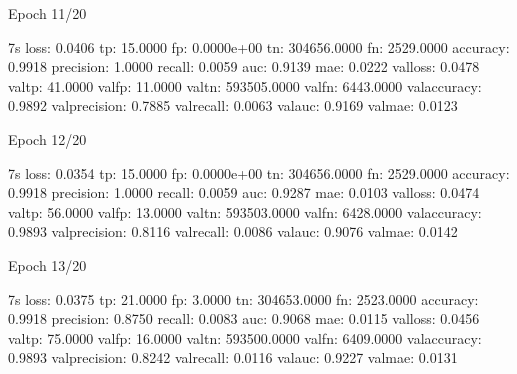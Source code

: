 \documentclass[letterpaper,10pt,english]{sphinxmanual}
\begin{document}
\begin{sphinxVerbatim}[commandchars=\\\{\}]
Epoch 11/20
\end{sphinxVerbatim}

\begin{sphinxVerbatim}[commandchars=\\\{\}]
 \PYGZhy{} 7s \PYGZhy{} loss: 0.0406 \PYGZhy{} tp: 15.0000 \PYGZhy{} fp: 0.0000e+00 \PYGZhy{} tn: 304656.0000 \PYGZhy{} fn: 2529.0000 \PYGZhy{} accuracy: 0.9918 \PYGZhy{} precision: 1.0000 \PYGZhy{} recall: 0.0059 \PYGZhy{} auc: 0.9139 \PYGZhy{} mae: 0.0222 \PYGZhy{} val\PYGZus{}loss: 0.0478 \PYGZhy{} val\PYGZus{}tp: 41.0000 \PYGZhy{} val\PYGZus{}fp: 11.0000 \PYGZhy{} val\PYGZus{}tn: 593505.0000 \PYGZhy{} val\PYGZus{}fn: 6443.0000 \PYGZhy{} val\PYGZus{}accuracy: 0.9892 \PYGZhy{} val\PYGZus{}precision: 0.7885 \PYGZhy{} val\PYGZus{}recall: 0.0063 \PYGZhy{} val\PYGZus{}auc: 0.9169 \PYGZhy{} val\PYGZus{}mae: 0.0123
\end{sphinxVerbatim}

\begin{sphinxVerbatim}[commandchars=\\\{\}]
Epoch 12/20
\end{sphinxVerbatim}

\begin{sphinxVerbatim}[commandchars=\\\{\}]
 \PYGZhy{} 7s \PYGZhy{} loss: 0.0354 \PYGZhy{} tp: 15.0000 \PYGZhy{} fp: 0.0000e+00 \PYGZhy{} tn: 304656.0000 \PYGZhy{} fn: 2529.0000 \PYGZhy{} accuracy: 0.9918 \PYGZhy{} precision: 1.0000 \PYGZhy{} recall: 0.0059 \PYGZhy{} auc: 0.9287 \PYGZhy{} mae: 0.0103 \PYGZhy{} val\PYGZus{}loss: 0.0474 \PYGZhy{} val\PYGZus{}tp: 56.0000 \PYGZhy{} val\PYGZus{}fp: 13.0000 \PYGZhy{} val\PYGZus{}tn: 593503.0000 \PYGZhy{} val\PYGZus{}fn: 6428.0000 \PYGZhy{} val\PYGZus{}accuracy: 0.9893 \PYGZhy{} val\PYGZus{}precision: 0.8116 \PYGZhy{} val\PYGZus{}recall: 0.0086 \PYGZhy{} val\PYGZus{}auc: 0.9076 \PYGZhy{} val\PYGZus{}mae: 0.0142
\end{sphinxVerbatim}

\begin{sphinxVerbatim}[commandchars=\\\{\}]
Epoch 13/20
\end{sphinxVerbatim}

\begin{sphinxVerbatim}[commandchars=\\\{\}]
 \PYGZhy{} 7s \PYGZhy{} loss: 0.0375 \PYGZhy{} tp: 21.0000 \PYGZhy{} fp: 3.0000 \PYGZhy{} tn: 304653.0000 \PYGZhy{} fn: 2523.0000 \PYGZhy{} accuracy: 0.9918 \PYGZhy{} precision: 0.8750 \PYGZhy{} recall: 0.0083 \PYGZhy{} auc: 0.9068 \PYGZhy{} mae: 0.0115 \PYGZhy{} val\PYGZus{}loss: 0.0456 \PYGZhy{} val\PYGZus{}tp: 75.0000 \PYGZhy{} val\PYGZus{}fp: 16.0000 \PYGZhy{} val\PYGZus{}tn: 593500.0000 \PYGZhy{} val\PYGZus{}fn: 6409.0000 \PYGZhy{} val\PYGZus{}accuracy: 0.9893 \PYGZhy{} val\PYGZus{}precision: 0.8242 \PYGZhy{} val\PYGZus{}recall: 0.0116 \PYGZhy{} val\PYGZus{}auc: 0.9227 \PYGZhy{} val\PYGZus{}mae: 0.0131
\end{sphinxVerbatim}
\end{document}
